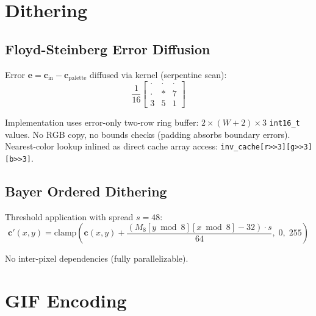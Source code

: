 \documentclass[11pt,a4paper]{article}
\begin{document}
\section{Dithering}

\subsection{Floyd-Steinberg Error Diffusion}

Error $\mathbf{e} = \mathbf{c}_{\mathrm{in}} - \mathbf{c}_{\mathrm{palette}}$
diffused via kernel (serpentine scan):
\begin{equation}
  \frac{1}{16}\begin{bmatrix}
    \cdot & \cdot & \cdot \\
    \cdot &   *   &   7   \\
      3   &   5   &   1
  \end{bmatrix}
\end{equation}

Implementation uses error-only two-row ring buffer:
$2 \times (W+2) \times 3$ \texttt{int16\_t} values. No RGB copy,
no bounds checks (padding absorbs boundary errors).
Nearest-color lookup inlined as direct cache array access:
\texttt{inv\_cache[r>>3][g>>3][b>>3]}.

\subsection{Bayer Ordered Dithering}

Threshold application with spread $s = 48$:
\begin{equation}
  \mathbf{c}'(x,y) = \mathrm{clamp}\!\left(
    \mathbf{c}(x,y) + \frac{(M_8[y \bmod 8][x \bmod 8] - 32) \cdot s}{64},\;
    0,\; 255
  \right)
\end{equation}

No inter-pixel dependencies (fully parallelizable).

\section{GIF Encoding}
\end{document}
